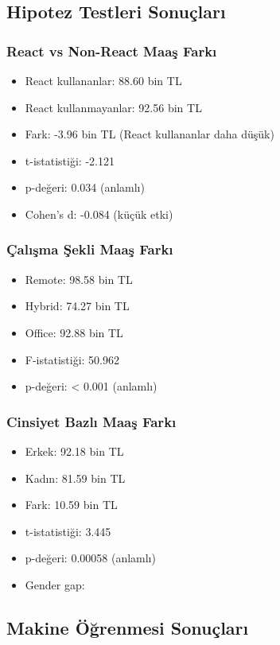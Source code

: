 \documentclass[12pt,a4paper]{article}
\begin{document}
\subsection{Hipotez Testleri Sonuçları}

\subsubsection{React vs Non-React Maaş Farkı}
\begin{itemize}
    \item React kullananlar: 88.60 bin TL
    \item React kullanmayanlar: 92.56 bin TL
    \item Fark: -3.96 bin TL (React kullananlar daha düşük)
    \item t-istatistiği: -2.121
    \item p-değeri: 0.034 (anlamlı)
    \item Cohen's d: -0.084 (küçük etki)
\end{itemize}

\subsubsection{Çalışma Şekli Maaş Farkı}
\begin{itemize}
    \item Remote: 98.58 bin TL
    \item Hybrid: 74.27 bin TL
    \item Office: 92.88 bin TL
    \item F-istatistiği: 50.962
    \item p-değeri: < 0.001 (anlamlı)
\end{itemize}

\subsubsection{Cinsiyet Bazlı Maaş Farkı}
\begin{itemize}
    \item Erkek: 92.18 bin TL
    \item Kadın: 81.59 bin TL
    \item Fark: 10.59 bin TL
    \item t-istatistiği: 3.445
    \item p-değeri: 0.00058 (anlamlı)
    \item Gender gap: %
\end{itemize}

\subsection{Makine Öğrenmesi Sonuçları}
\end{document}

